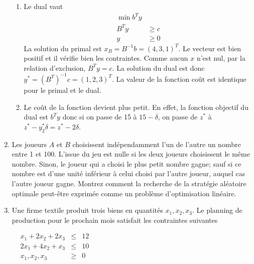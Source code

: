 \begin{enumerate}
    \begin{solution}
      \begin{enumerate}
        \item
          Le dual vaut
          \begin{align*}
            \min b^Ty\\
            B^Ty & \geq c\\
            y & \geq 0
          \end{align*}
          La solution du primal est $x_B = B^{-1}b = (4,3,1)^{T}$.
          Le vecteur est bien positif et il vérifie bien les contraintes.
          Comme aucun $x$ n'est nul, par la relation d'exclusion,
          $B^T y = c$.
          La solution du dual est donc $y^{*} = (B^T)^{-1}c = (1,2,3)^{T}$.
          La valeur de la fonction coût est identique
          pour le primal et le dual.
        \item Le coût de la fonction devient plus petit.
          En effet, la fonction objectif du dual est $b^Ty$ donc si
          on passe de 15 à $15 - \delta$, on passe de $z^*$ à
          $z^* - y_2^* \delta = z^* - 2\delta$.
      \end{enumerate}
    \end{solution}

  \item Les joueurs $A$ et $B$ choisissent indépendamment l'un de l'autre un nombre entre 1 et 100. L'issue du jeu est nulle si les
    deux joueurs choisissent le même nombre. Sinon, le joueur qui a choisi le plus petit nombre gagne; sauf si ce nombre est d'une unité
    inférieur à celui choisi par l'autre joueur, auquel cas l'autre joueur gagne. Montrez comment la recherche de la stratégie aléatoire
    optimale peut-être exprimée comme un problème d'optimisation linéaire.


    \begin{solution}
      \nosolution
    \end{solution}

  \item Une firme textile produit trois biens en quantités $x_1, x_2, x_3$. Le planning de production pour le prochain mois satisfait
    les contraintes suivantes

    $
    \begin{array}{llcr}
      & x_1+2x_2 +2x_3 & \leq & 12\\
      & 2x_1+4x_2 +x_3 & \leq & 10\\
      & x_1, x_2, x_3 & \geq & 0
    \end{array}
    $


\end{enumerate}
